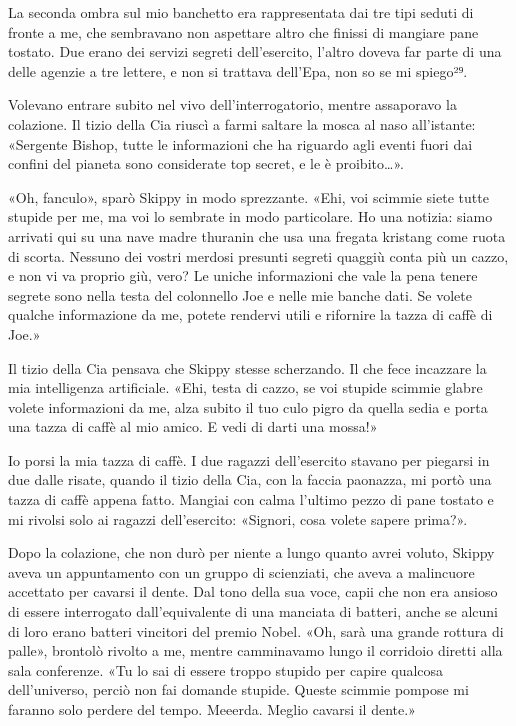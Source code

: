 La seconda ombra sul mio banchetto era rappresentata dai tre tipi seduti
di fronte a me, che sembravano non aspettare altro che finissi di
mangiare pane tostato. Due erano dei servizi segreti dell'esercito,
l'altro doveva far parte di una delle agenzie a tre lettere, e non si
trattava dell'Epa, non so se mi spiego²⁹.

Volevano entrare subito nel vivo dell'interrogatorio, mentre assaporavo
la colazione. Il tizio della Cia riuscì a farmi saltare la mosca al naso
all'istante: «Sergente Bishop, tutte le informazioni che ha riguardo
agli eventi fuori dai confini del pianeta sono considerate top secret, e
le è proibito\ldots».

«Oh, fanculo», sparò Skippy in modo sprezzante. «Ehi, voi scimmie siete
tutte stupide per me, ma voi lo sembrate in modo particolare. Ho una
notizia: siamo arrivati qui su una nave madre thuranin che usa una
fregata kristang come ruota di scorta. Nessuno dei vostri merdosi
presunti segreti quaggiù conta più un cazzo, e non vi va proprio giù,
vero? Le uniche informazioni che vale la pena tenere segrete sono nella
testa del colonnello Joe e nelle mie banche dati. Se volete qualche
informazione da me, potete rendervi utili e rifornire la tazza di caffè
di Joe.»

Il tizio della Cia pensava che Skippy stesse scherzando. Il che fece
incazzare la mia intelligenza artificiale. «Ehi, testa di cazzo, se voi
stupide scimmie glabre volete informazioni da me, alza subito il tuo
culo pigro da quella sedia e porta una tazza di caffè al mio amico. E
vedi di darti una mossa!»

Io porsi la mia tazza di caffè. I due ragazzi dell'esercito stavano per
piegarsi in due dalle risate, quando il tizio della Cia, con la faccia
paonazza, mi portò una tazza di caffè appena fatto. Mangiai con calma
l'ultimo pezzo di pane tostato e mi rivolsi solo ai ragazzi
dell'esercito: «Signori, cosa volete sapere prima?».

\hfill\break

Dopo la colazione, che non durò per niente a lungo quanto avrei voluto,
Skippy aveva un appuntamento con un gruppo di scienziati, che aveva a
malincuore accettato per cavarsi il dente. Dal tono della sua voce,
capii che non era ansioso di essere interrogato dall'equivalente di una
manciata di batteri, anche se alcuni di loro erano batteri vincitori del
premio Nobel. «Oh, sarà una grande rottura di palle», brontolò rivolto a
me, mentre camminavamo lungo il corridoio diretti alla sala conferenze.
«Tu lo sai di essere troppo stupido per capire qualcosa dell'universo,
perciò non fai domande stupide. Queste scimmie pompose mi faranno solo
perdere del tempo. Meeerda. Meglio cavarsi il dente.»

